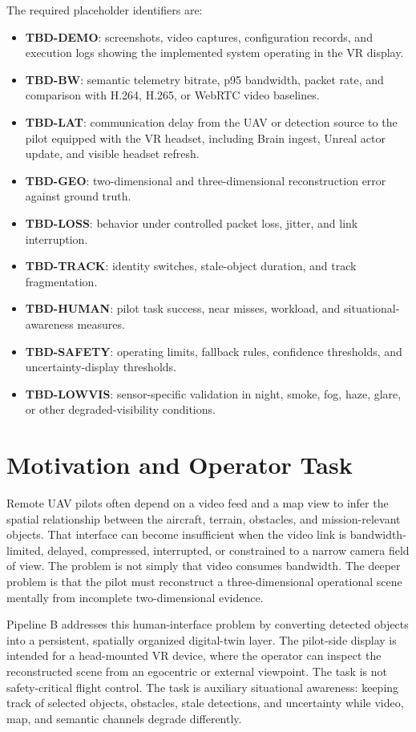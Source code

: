 \documentclass[11pt,a4paper]{article}
\begin{document}
The required placeholder identifiers are:

\begin{itemize}
    \item \textbf{TBD-DEMO}: screenshots, video captures, configuration records, and execution logs showing the implemented system operating in the VR display.
    \item \textbf{TBD-BW}: semantic telemetry bitrate, p95 bandwidth, packet rate, and comparison with H.264, H.265, or WebRTC video baselines.
    \item \textbf{TBD-LAT}: communication delay from the UAV or detection source to the pilot equipped with the VR headset, including Brain ingest, Unreal actor update, and visible headset refresh.
    \item \textbf{TBD-GEO}: two-dimensional and three-dimensional reconstruction error against ground truth.
    \item \textbf{TBD-LOSS}: behavior under controlled packet loss, jitter, and link interruption.
    \item \textbf{TBD-TRACK}: identity switches, stale-object duration, and track fragmentation.
    \item \textbf{TBD-HUMAN}: pilot task success, near misses, workload, and situational-awareness measures.
    \item \textbf{TBD-SAFETY}: operating limits, fallback rules, confidence thresholds, and uncertainty-display thresholds.
    \item \textbf{TBD-LOWVIS}: sensor-specific validation in night, smoke, fog, haze, glare, or other degraded-visibility conditions.
\end{itemize}

\section{Motivation and Operator Task}

Remote UAV pilots often depend on a video feed and a map view to infer the spatial relationship between the aircraft, terrain, obstacles, and mission-relevant objects. That interface can become insufficient when the video link is bandwidth-limited, delayed, compressed, interrupted, or constrained to a narrow camera field of view. The problem is not simply that video consumes bandwidth. The deeper problem is that the pilot must reconstruct a three-dimensional operational scene mentally from incomplete two-dimensional evidence.

Pipeline B addresses this human-interface problem by converting detected objects into a persistent, spatially organized digital-twin layer. The pilot-side display is intended for a head-mounted VR device, where the operator can inspect the reconstructed scene from an egocentric or external viewpoint. The task is not safety-critical flight control. The task is auxiliary situational awareness: keeping track of selected objects, obstacles, stale detections, and uncertainty while video, map, and semantic channels degrade differently.
\end{document}
